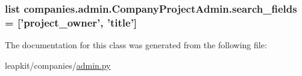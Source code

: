 \hypertarget{classcompanies_1_1admin_1_1_company_project_admin_a145d6b8ce6c943fb25efbb950ea4d79b}{
\subsubsection[{search\-\_\-fields}]{\setlength{\rightskip}{0pt plus 5cm}list companies.\-admin.\-Company\-Project\-Admin.\-search\-\_\-fields = \mbox{[}'project\-\_\-owner', 'title'\mbox{]}\hspace{0.3cm}{\ttfamily [static]}}}\label{classcompanies_1_1admin_1_1_company_project_admin_a145d6b8ce6c943fb25efbb950ea4d79b}


The documentation for this class was generated from the following file\-:\begin{DoxyCompactItemize}
\item 
leapkit/companies/\hyperlink{companies_2admin_8py}{admin.\-py}\end{DoxyCompactItemize}
